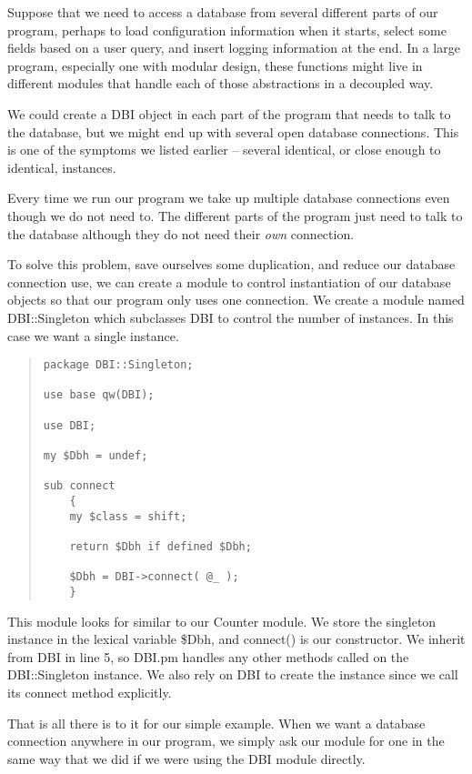 Suppose that we need to access a database from several
different parts of our program, perhaps to load
configuration information when it starts, select some fields based
on a user query, and insert logging information at the end.
In a large program, especially one with modular design, these
functions might live in different modules that handle each of
those abstractions in a decoupled way.  

We could create a DBI object in each part of the
program that needs to talk to the database, but we might end
up with several open database connections.  This
is one of the symptoms we listed earlier -- several
identical, or close enough to identical, instances.  

Every time we run our program we take up multiple database
connections even though we do not need to.  The different
parts of the program just need to talk to the database
although they do not need their {\it own} connection.

To
solve this problem, save ourselves some duplication, and
reduce our database connection use, we can create a module
to control instantiation of our database objects so that 
our program only uses one connection.  We create a module
named DBI::Singleton which subclasses DBI to control the
number of instances. In this case we want a single instance.

\begin{quote}    
\begin{verbatim}
package DBI::Singleton;

use base qw(DBI);

use DBI;

my $Dbh = undef;

sub connect
    {
    my $class = shift;
    
    return $Dbh if defined $Dbh;
    
    $Dbh = DBI->connect( @_ );
    }
\end{verbatim}
\end{quote}    

This module looks for similar to our Counter module.  We
store the singleton instance in the lexical variable \$Dbh,
and connect() is our constructor.  We inherit from DBI in
line 5, so DBI.pm handles any other methods called on the
DBI::Singleton instance.  We also rely on DBI to create the
instance since we call its connect method explicitly.

That is all there is to it for our simple example.  When we
want a database connection anywhere in our program, we
simply ask our module for one in the same way that we did if
we were using the DBI module directly.

